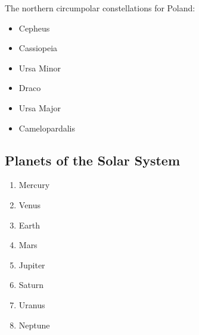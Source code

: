 The northern circumpolar constellations for Poland:
\begin{itemize}[label=$\star$]
    \item Cepheus 
    \item Cassiopeia 
    \item Ursa Minor
    \item Draco
    \item Ursa Major
    \item Camelopardalis
\end{itemize}

\subsection{Planets of the Solar System}
\begin{enumerate}
    \item Mercury
    \item Venus
    \item Earth
    \item Mars
    \item Jupiter
    \item Saturn
    \item Uranus
    \item Neptune
\end{enumerate}